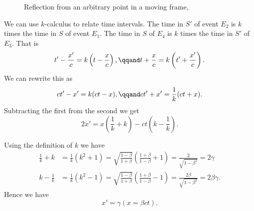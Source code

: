 \documentclass[fleqn]{NotesClass}
\begin{document}
\begin{figure}
        \caption{Reflection from an arbitrary point in a moving frame,}
        \label{fig:reflection from arbitrary point}
    \end{figure}
    
    We can use \(k\)-calculus to relate time intervals.
    The time in \(S'\) of event \(E_2\) is \(k\) times the time in \(S\) of event \(E_1\).
    The time in \(S\) of \(E_4\) is \(k\) times the time in \(S'\) of \(E_3\).
    That is
    \begin{equation}
        t' - \frac{x'}{c} = k\left( t - \frac{x}{c} \right), \qqand t + \frac{x}{c} = k\left( t' + \frac{x'}{c} \right).
    \end{equation}
    We can rewrite this as
    \begin{equation}
        ct' - x' = k(ct - x), \qqand ct' + x' = \frac{1}{k}(ct + x).
    \end{equation}
    Subtracting the first from the second we get
    \begin{equation}
        2x' = x\left( \frac{1}{k} + k \right) - ct\left( k - \frac{1}{k} \right).
    \end{equation}
    
    Using the definition of \(k\) we have
    \begin{align}
        \frac{1}{k} + k &= \frac{1}{k}(k^2 + 1) = \sqrt{\frac{1 - \beta}{1 + \beta}}\left( \frac{1 + \beta}{1 - \beta} + 1 \right) = \frac{2}{\sqrt{1 - \beta^2}} = 2\gamma\\
        k - \frac{1}{k} &= \frac{1}{k}(k^2 - 1) = \sqrt{\frac{1 - \beta}{1 + \beta}}\left( \frac{1 + \beta}{1 - \beta} - 1 \right) = \frac{2\beta}{\sqrt{1 - \beta^2}} = 2\beta \gamma.
    \end{align}
    Hence we have
    \begin{equation}
        x' = \gamma(x = \beta c t).
    \end{equation}
    
\end{document}
